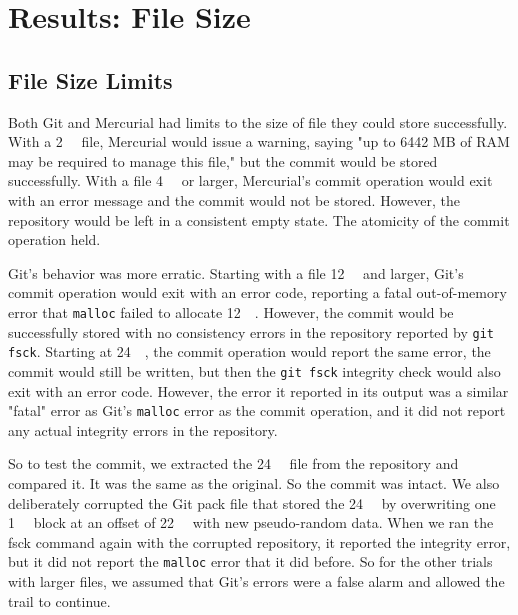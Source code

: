 \section{Results: File Size}

\subsection{File Size Limits}
\label{file-size-limits-results}

Both Git and Mercurial had limits to the size of file they could store
successfully. With a \SI{2}{\gibi\byte} file, Mercurial would issue a warning,
saying "up to 6442 MB of RAM may be required to manage this file," but the
commit would be stored successfully. With a file \SI{4}{\gibi\byte} or larger,
Mercurial's commit operation would exit with an error message and the commit
would not be stored. However, the repository would be left in a consistent empty
state. The atomicity of the commit operation held.

Git's behavior was more erratic. Starting with a file \SI{12}{\gibi\byte} and
larger, Git's commit operation would exit with an error code, reporting a fatal
out-of-memory error that \lstinline{malloc} failed to allocate
\SI{12}{\gibi\byte}. However, the commit would be successfully stored with no
consistency errors in the repository reported by \lstinline{git fsck}. Starting
at \SI{24}{\gibi\byte}, the commit operation would report the same error, the
commit would still be written, but then the \lstinline{git fsck} integrity check
would also exit with an error code. However, the error it reported in its output
was a similar "fatal" error as Git's \lstinline{malloc} error as the commit
operation, and it did not report any actual integrity errors in the repository.

So to test the commit, we extracted the \SI{24}{\gibi\byte} file from the
repository and compared it. It was the same as the original. So the commit was
intact. We also deliberately corrupted the Git pack file that stored the
\SI{24}{\gibi\byte} by overwriting one \SI{1}{\mebi\byte} block at an offset of
\SI{22}{\gibi\byte} with new pseudo-random data. When we ran the fsck command
again with the corrupted repository, it reported the integrity error, but it did
not report the \lstinline{malloc} error that it did before. So for the other
trials with larger files, we assumed that Git's errors were a false alarm and
allowed the trail to continue.


